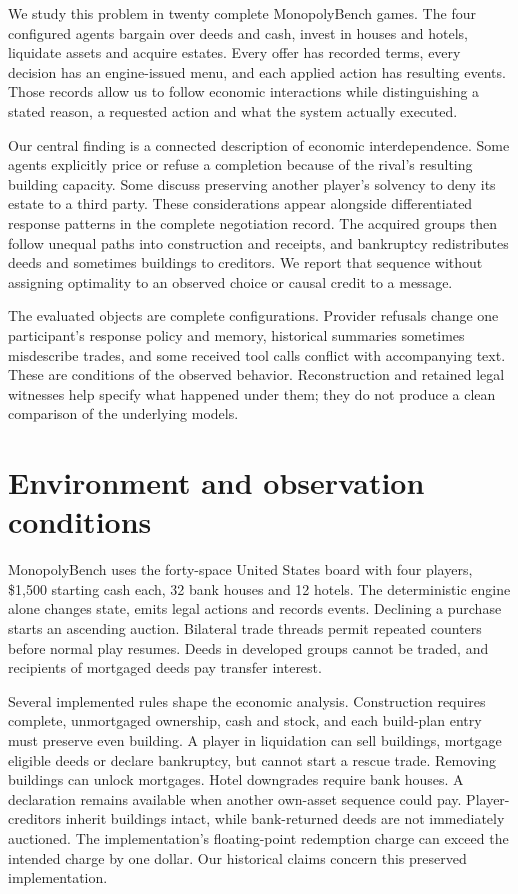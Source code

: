 We study this problem in twenty complete MonopolyBench games. The four configured agents bargain over deeds and cash, invest in houses and hotels, liquidate assets and acquire estates. Every offer has recorded terms, every decision has an engine-issued menu, and each applied action has resulting events. Those records allow us to follow economic interactions while distinguishing a stated reason, a requested action and what the system actually executed.

Our central finding is a connected description of economic interdependence. Some agents explicitly price or refuse a completion because of the rival's resulting building capacity. Some discuss preserving another player's solvency to deny its estate to a third party. These considerations appear alongside differentiated response patterns in the complete negotiation record. The acquired groups then follow unequal paths into construction and receipts, and bankruptcy redistributes deeds and sometimes buildings to creditors. We report that sequence without assigning optimality to an observed choice or causal credit to a message.

The evaluated objects are complete configurations. Provider refusals change one participant's response policy and memory, historical summaries sometimes misdescribe trades, and some received tool calls conflict with accompanying text. These are conditions of the observed behavior. Reconstruction and retained legal witnesses help specify what happened under them; they do not produce a clean comparison of the underlying models.

\section{Environment and observation conditions}

MonopolyBench uses the forty-space United States board with four players, \$1,500 starting cash each, 32 bank houses and 12 hotels. The deterministic engine alone changes state, emits legal actions and records events. Declining a purchase starts an ascending auction. Bilateral trade threads permit repeated counters before normal play resumes. Deeds in developed groups cannot be traded, and recipients of mortgaged deeds pay transfer interest.

Several implemented rules shape the economic analysis. Construction requires complete, unmortgaged ownership, cash and stock, and each build-plan entry must preserve even building. A player in liquidation can sell buildings, mortgage eligible deeds or declare bankruptcy, but cannot start a rescue trade. Removing buildings can unlock mortgages. Hotel downgrades require bank houses. A declaration remains available when another own-asset sequence could pay. Player-creditors inherit buildings intact, while bank-returned deeds are not immediately auctioned. The implementation's floating-point redemption charge can exceed the intended charge by one dollar. Our historical claims concern this preserved implementation.

